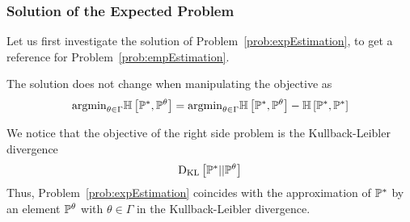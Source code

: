 \subsubsection{Solution of the Expected Problem}

Let us first investigate the solution of Problem~\ref{prob:expEstimation}, to get a reference for Problem~\ref{prob:empEstimation}.

%

The solution does not change when manipulating the objective as
\begin{align}
		\mathrm{argmin}_{\theta\in\Gamma} \mathbb{H}\left[\mathbb{P}^*,\mathbb{P}^{\theta}\right]
		= \mathrm{argmin}_{\theta\in\Gamma} \mathbb{H}\left[\mathbb{P}^*,\mathbb{P}^{\theta}\right] -  \mathbb{H}\left[\mathbb{P}^*,\mathbb{P}^*\right]
\end{align}

We notice that the objective of the right side problem is the Kullback-Leibler divergence
	\begin{align}
		 \mathrm{D}_{\mathrm{KL}}\left[ \mathbb{P}^* || \mathbb{P}^{\theta} \right]
	\end{align}
Thus, Problem~\ref{prob:expEstimation} coincides with the approximation of $\mathbb{P}^*$ by an element $\mathbb{P}^{\theta}$ with $\theta\in\Gamma$ in the Kullback-Leibler divergence.

